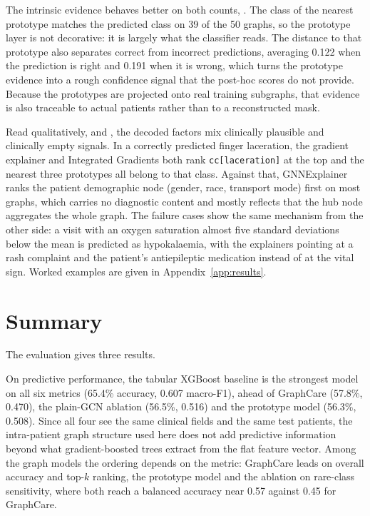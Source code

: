 The intrinsic evidence behaves better on both counts, . The class of the nearest prototype matches the predicted class on 39 of
the 50 graphs, so the prototype layer is not decorative: it is largely what the
classifier reads. The distance
to that prototype also separates correct from incorrect predictions, averaging
0.122 when the prediction is right and 0.191 when it is wrong, which turns the
prototype evidence into a rough confidence signal that the post-hoc scores do
not provide. Because the prototypes are projected onto real training subgraphs,
that evidence is also traceable to actual patients rather than to a
reconstructed mask.

Read qualitatively, and , the decoded factors mix
clinically plausible and clinically empty signals. In a correctly predicted
finger laceration, the gradient
explainer and Integrated Gradients both rank \texttt{cc[laceration]} at the top
and the nearest three prototypes all belong to that class. Against that,
GNNExplainer ranks the patient demographic node (gender, race, transport mode)
first on most graphs, which carries no diagnostic content and mostly reflects
that the hub node aggregates the whole graph. The failure cases show the same
mechanism from the other side: a visit with an oxygen saturation almost five
standard deviations below the mean is predicted as hypokalaemia, with the
explainers pointing at a rash complaint and the patient's antiepileptic
medication instead of at the vital sign. Worked examples are given in
Appendix~\ref{app:results}.

\section{Summary}
\label{sec:eval-summary}

The evaluation gives three results.

On predictive performance, the tabular XGBoost baseline is the strongest model
on all six metrics (65.4\% accuracy, 0.607 macro-F1), ahead of GraphCare
(57.8\%, 0.470), the plain-GCN ablation (56.5\%, 0.516) and the prototype model
(56.3\%, 0.508). Since all four see the same clinical fields and the same test
patients, the intra-patient graph structure used here does not add predictive
information beyond what gradient-boosted trees extract from the flat feature
vector. Among the graph models the ordering depends on the metric: GraphCare
leads on overall accuracy and top-$k$ ranking, the prototype model and the
ablation on rare-class sensitivity, where both reach a balanced accuracy near
0.57 against 0.45 for GraphCare.

